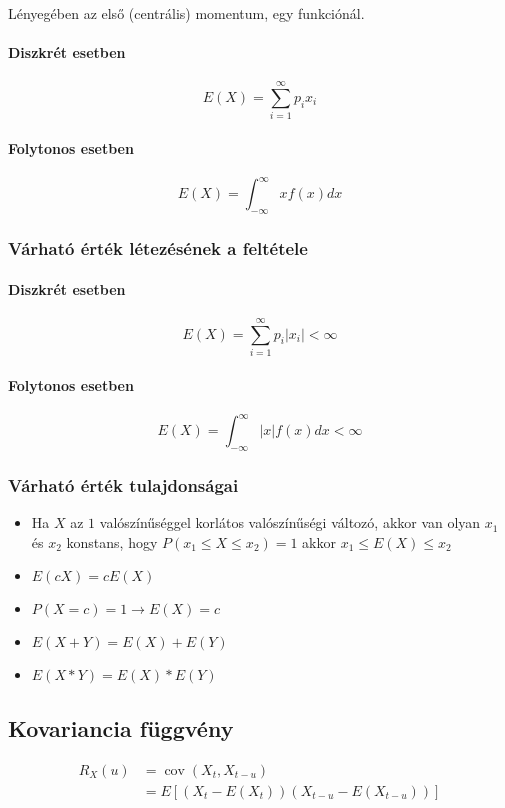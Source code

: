 \documentclass[11pt,a4paper]{article}
\begin{document}
				\paragraph{}
					Lényegében az első (centrális) momentum, egy funkciónál.
				\paragraph{Diszkrét esetben}
					$$E(X) = \sum_{i=1}^{\infty}p_i x_i$$
				\paragraph{Folytonos esetben}
					$$E(X) = \int_{-\infty}^{\infty}x f(x)dx$$
				\subsubsection{Várható érték létezésének a feltétele}
					\paragraph{Diszkrét esetben}
						$$E(X) = \sum_{i=1}^{\infty}p_i |x_i| < \infty$$
					\paragraph{Folytonos esetben}
						$$E(X) = \int_{-\infty}^{\infty}|x| f(x)dx < \infty$$
	
				\subsubsection{Várható érték tulajdonságai}
					\begin{itemize}
						\item Ha $X$ az $1$ valószínűséggel korlátos valószínűségi változó, akkor van olyan $x_1$ és $x_2$ konstans, hogy $P(x_1 \le X \le x_2)=1$ akkor $x_1 \le E(X) \le x_2$
						\item $E(cX)=cE(X)$
						\item $P(X=c) = 1 \to E(X)=c$
						\item $E(X+Y) = E(X) + E(Y)$
						\item $E(X*Y)=E(X)*E(Y)$
					\end{itemize}
	
			\subsection{Kovariancia függvény}
				$$ \begin{aligned}
					R_X(u) &= \operatorname{cov}(X_t, X_{t-u}) \\
					&= E[(X_t - E(X_t))(X_{t-u}-E(X_{t-u}))]
				\end{aligned} $$
	
\end{document}
